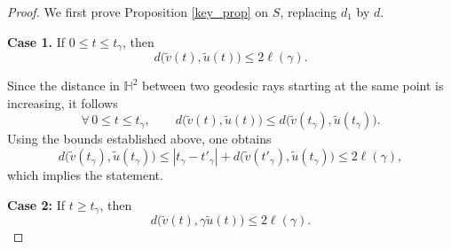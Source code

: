 \documentclass[a4paper,english,reqno]{amsart}
\theoremstyle{definition}
\numberwithin{equation}{section}
\begin{document}
\begin{proof}
 	
 	We first prove Proposition \ref{key_prop} on $S$, replacing $d_1$ by $d$.	
 	
 	
 	\noindent\textbf{Case 1.}  If $0\le t\le t_\gamma$, then 
 	\[
 	d\bigl(\tilde v(t),\tilde u(t)\bigr)\le 2\ell(\gamma).
 	\] 

 Since the distance in $\mathbb{H}^2$ between two geodesic rays starting at the same point is increasing, it follows 
 \[
  	\forall\,0\le t\le t_\gamma,\qquad
  	d\bigl(\tilde v(t),\tilde u(t)\bigr)\le d\bigl(\tilde v(t_\gamma),\tilde u(t_\gamma)\bigr).
  	\]
Using the bounds established above, one obtains
 	\[
 	d\bigl(\tilde v(t_\gamma),\tilde u(t_\gamma)\bigr) \le 
 	|t_\gamma - t'_\gamma | + d\bigl(\tilde v(t'_\gamma),\tilde u(t_\gamma)\bigr)  \le
 	2\ell(\gamma),
  	\]
which implies the statement.
 	
% 
 	
 	\smallskip
 	\noindent\textbf{Case 2:} If $ t\ge  t_\gamma$, then 
 	\[
 	d\bigl(\tilde v(t), \gamma \tilde u(t)\bigr)\le 2\ell(\gamma).
 	\] 
 	

\end{proof}
\end{document}

